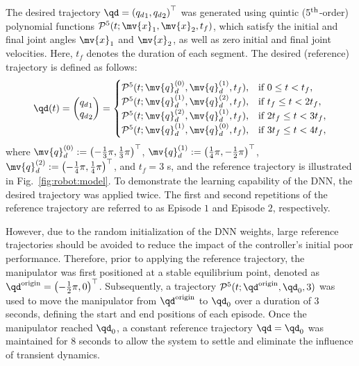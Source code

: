 \documentclass[journal]{IEEEtran}
\begin{document}
The desired trajectory $\qd=\left({q_d}_1,{q_d}_2\right)^\top $ was generated using quintic (5$\textsuperscript{th}$-order) polynomial functions $\mathcal{P}^5(t;\mv{x}_1,\mv{x}_2,t_f)$, which satisfy the initial and final joint angles $\mv{x}_1$ and $\mv{x}_2$, as well as zero initial and final joint velocities. 
Here, $t_f$ denotes the duration of each segment.
The desired (reference) trajectory is defined as follows:
\begin{equation}
    \qd(t) 
    =
    \begin{pmatrix}
        {q_d}_1
        \\
        {q_d}_2
    \end{pmatrix}
    =
    \begin{cases}
    \mathcal{P}^5(t;\mv{q}_d^{(0)},\mv{q}_d^{(1)},t_f),
        &
        \text{if } 0 \le t < t_f 
        ,
        \\
    \mathcal{P}^5(t;\mv{q}_d^{(1)},\mv{q}_d^{(2)},t_f),
        &
        \text{if } t_f \le t < 2t_f 
        ,
        \\
    \mathcal{P}^5(t;\mv{q}_d^{(2)},\mv{q}_d^{(1)},t_f),
        & 
        \text{if } 2t_f \le t < 3t_f 
        ,
        \\
    \mathcal{P}^5(t;\mv{q}_d^{(1)},\mv{q}_d^{(0)},t_f),
        &    
        \text{if } 3t_f \le t < 4t_f 
        ,
        \\
    \end{cases}
    \label{eq:desired trajectory}
\end{equation}
where 
$
    \mv{q}_d^{(0)}:=\left(-\tfrac{1}{3}\pi,\tfrac{1}{3}\pi\right)^\top
$, 
$
    \mv{q}_d^{(1)}:=\left(\tfrac{1}{4}\pi,-\tfrac{1}{2}\pi\right)^\top
$, 
$
    \mv{q}_d^{(2)}:=\left(-\tfrac{1}{4}\pi,\tfrac{1}{4}\pi\right)^\top
$, 
and $t_f=3$ s, and the reference trajectory is illustrated in Fig.~\ref{fig:robot:model}.
To demonstrate the learning capability of the DNN, the desired trajectory was applied twice. 
The first and second repetitions of the reference trajectory are referred to as Episode $1$ and Episode $2$, respectively.

However, due to the random initialization of the DNN weights, large reference trajectories should be avoided to reduce the impact of the controller's initial poor performance.
Therefore, prior to applying the reference trajectory, the manipulator was first positioned at a stable equilibrium point, denoted as ${\qd}^{\rm{origin}} = \left(-\tfrac{1}{2}\pi, 0\right)^\top$.
Subsequently, a trajectory $\mathcal{P}^5(t; {\qd}^{\rm{origin}}, {\qd}_0, 3)$ was used to move the manipulator from ${\qd}^{\rm{origin}}$ to ${\qd}_0$ over a duration of 3 seconds, defining the start and end positions of each episode.
Once the manipulator reached ${\qd}_0$, a constant reference trajectory $\qd = {\qd}_0$ was maintained for 8 seconds to allow the system to settle and eliminate the influence of transient dynamics.
\end{document}
